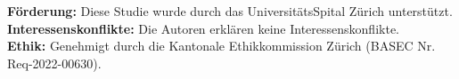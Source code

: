\documentclass[11pt,a4paper]{article}
\begin{document}
\vfill

\begin{center}
\footnotesize
\textbf{Förderung:} Diese Studie wurde durch das UniversitätsSpital Zürich unterstützt.\\
\textbf{Interessenskonflikte:} Die Autoren erklären keine Interessenskonflikte.\\
\textbf{Ethik:} Genehmigt durch die Kantonale Ethikkommission Zürich (BASEC Nr. Req-2022-00630).
\end{center}
\end{document}
